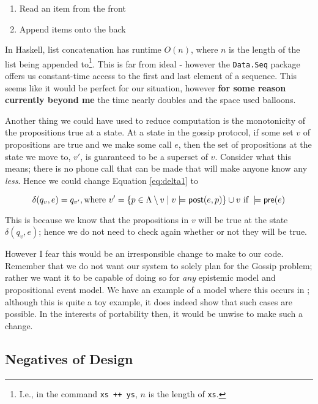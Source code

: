 \documentclass[12pt, a4paper]{article}
\begin{document}
\begin{enumerate}
\item Read an item from the front
\item Append items onto the back
\end{enumerate}

In Haskell, list concatenation has runtime $O(n)$, where $n$ is the length of
the list being appended to\footnote{I.e., in the command \texttt{xs ++ ys}, $n$
  is the length of \texttt{xs}.}. This is far from ideal - however the
\texttt{Data.Seq} package offers us constant-time access to the first and last
element of a sequence. This seems like it would be perfect for our situation,
however \textbf{for some reason currently beyond me} the time nearly doubles and
the space used balloons.

\bigskip

Another thing we could have used to reduce computation is the monotonicity of
the propositions true at a state. At a state in the gossip protocol, if some set
$v$ of propositions are true and we make some call $e$, then the set of
propositions at the state we move to, $v'$, is guaranteed to be a superset of
$v$. Consider what this means; there is no phone call that can be made that will
make anyone know any \textit{less}. Hence we could change Equation
\ref{eq:delta1} to

\begin{equation} \label{eq:delta2}
  \delta(q_v, e) = q_{v'}, \text{where } v' = \{p \in \Lambda \setminus v \mid v \models \textsf{post}(e, p)\} \cup v
  \text{ if } 
  \models \textsf{pre}(e)
\end{equation}

This is because we know that the propositions in $v$ will be true at the state
$\delta(q_v, e)$; hence we do not need to check again whether or not they will
be true. 

However I fear this would be an irresponsible change to make to our code.
Remember that we do not want our system to solely plan for the Gossip problem;
rather we want it to be capable of doing so for \textit{any} epistemic model and
propositional event model. We have an example of a model where this occurs in
; although this is quite a toy example, it does indeed show
that such cases are possible. In the interests of portability then, it would be
unwise to make such a change. 

\subsection{Negatives of Design}
\end{document}
